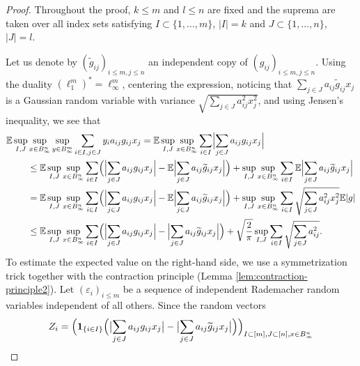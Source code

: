 \documentclass[a4paper]{amsart}
\theoremstyle{definition}
\theoremstyle{remark}
\numberwithin{equation}{section}
\newcommand*{\EE}{\mathbb{E}}
\newcommand*{\ind}{\mathbf{1}} %
\begin{document}
\begin{proof}
	Throughout the proof,  $k \leq m$ and $l\leq n$ are fixed and the suprema are taken over all index sets satisfying
	$I\subset \{1,\ldots,m\}$, $|I| = k$
	and $J\subset \{1,\ldots,n\}$, $|J| = l$.


Let us denote by $(\widetilde{g}_{ij})_{i\leq m, j\leq n}$ an independent copy of $(g_{ij})_{i\leq m, j\leq n}$.
Using the duality  $(\ell_1^m)^*=\ell_\infty^m$, centering the expression, noticing that $\sum_{j\in J} a_{ij} \widetilde{g}_{ij} x_j $ is a Gaussian random variable with variance  $\sqrt{\sum_{j\in J} a_{ij}^2  x_j^2}$, and using Jensen's inequality, we see that
\begin{align}	
	\EE \sup_{I, J} & \sup_{x\in B_\infty^n} \sup_{y\in B_\infty^m}
	\sum_{i\in I, j\in J} y_i a_{ij} g_{ij} x_j
	= \EE \sup_{I, J} \sup_{x\in B_\infty^n} \sum_{i\in I} \Bigl| \sum_{j\in J} a_{ij} g_{ij} x_j \Bigr| \nonumber\\	
	&\leq  \EE \sup_{I, J} \sup_{x\in B_\infty^n} \sum_{i\in I} \Bigl( \Bigl| \sum_{j\in J} a_{ij} g_{ij} x_j \Bigr|  - \EE  \Bigl| \sum_{j\in J} a_{ij} \widetilde{g}_{ij} x_j \Bigr|\Bigr)
	+ \sup_{I, J} \sup_{x\in B_\infty^n} \sum_{i\in I} \EE  \Bigl| \sum_{j\in J} a_{ij} \widetilde{g}_{ij} x_j \Bigr| \nonumber\\
	&=  \EE \sup_{I, J} \sup_{x\in B_\infty^n} \sum_{i\in I} \Bigl( \Bigl| \sum_{j\in J} a_{ij} g_{ij} x_j \Bigr|  - \EE  \Bigl| \sum_{j\in J} a_{ij} \widetilde{g}_{ij} x_j \Bigr|\Bigr)
	+ \sup_{I, J} \sup_{x\in B_\infty^n} \sum_{i\in I} \sqrt{\sum_{j\in J} a_{ij}^2  x_j^2} \EE |g|\nonumber\\
	&\leq  \EE \sup_{I, J} \sup_{x\in B_\infty^n} \sum_{i\in I} \Bigl( \Bigl| \sum_{j\in J} a_{ij} g_{ij} x_j \Bigr|  -   \Bigl| \sum_{j\in J} a_{ij} \widetilde{g}_{ij} x_j \Bigr|\Bigr)
	+ \sqrt{\frac{2}{\pi}}\sup_{I, J} \sum_{i\in I} \sqrt{\sum_{j\in J} a_{ij}^2  } .
	\label{eq:I-J-oo-1-step-i-center}
\end{align}
To estimate the expected value on the right-hand side, we use a symmetrization trick
together with the contraction principle (Lemma \ref{lem:contraction-principle2}).
Let $(\varepsilon_i)_{i\leq m}$ be a sequence of independent Rademacher random variables independent of all others. Since the random vectors 
	\[
	Z_i = \Bigl(\ind_{\{i\in I\}} \Bigl( \bigl|\sum_{j\in J} a_{ij}g_{ij}x_j \bigr| - \bigl|\sum_{j\in J} a_{ij}\widetilde{g}_{ij}x_j \bigr| \Bigr) \Bigr)_{I\subset[m], J\subset [n], x\in B_\infty^n}
\]
\end{proof}
\end{document}
